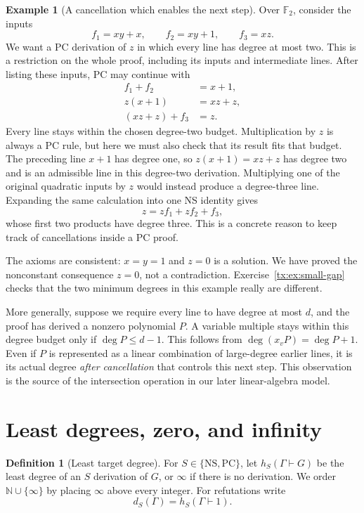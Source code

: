\documentclass[11pt,a4paper,oneside,openany]{book}
\theoremstyle{definition}\newtheorem{definition}[theorem]{Definition}
\newtheorem{example}[theorem]{Example}
\theoremstyle{remark}\newtheorem{remark}[theorem]{Remark}
\newcommand{\NS}{\mathrm{NS}}\newcommand{\PC}{\mathrm{PC}}
\newcommand{\NN}{\mathbb N}\newcommand{\N}{\mathbb N}\newcommand{\Z}{\mathbb Z}\newcommand{\Q}{\mathbb Q}\newcommand{\Fp}{\mathbb F_p}
\numberwithin{equation}{chapter}
\begin{document}
\begin{example}[A cancellation which enables the next step]\label{tx:eg:cancellation}
Over $\mathbb F_2$, consider the inputs
\[
                   f_1=xy+x,\qquad f_2=xy+1,\qquad f_3=xz.
\]
We want a PC derivation of $z$ in which every line has degree at most
two. This is a restriction on the whole proof, including its inputs and
intermediate lines. After listing these inputs, PC may continue with
\begin{align*}
 f_1+f_2&=x+1,\\
 z(x+1)&=xz+z,\\
 (xz+z)+f_3&=z.
\end{align*}
Every line stays within the chosen degree-two budget. Multiplication
by $z$ is always a PC rule, but here we must also check that its result
fits that budget. The preceding line $x+1$ has degree one, so
$z(x+1)=xz+z$ has degree two and is an admissible line in this
degree-two derivation. Multiplying one of the original quadratic inputs
by $z$ would instead produce a degree-three line. Expanding the same calculation into
one NS identity gives
\[
                          z=zf_1+zf_2+f_3,
\]
whose first two products have degree three. This is a concrete reason to
keep track of cancellations inside a PC proof.

The axioms are consistent: $x=y=1$ and $z=0$ is a solution. We have
proved the nonconstant consequence $z=0$, not a contradiction.
Exercise~\ref{tx:ex:small-gap} checks that the two minimum degrees in
this example really are different.
\end{example}

More generally, suppose we require every line to have degree at most
$d$, and the proof has derived a nonzero polynomial $P$. A variable
multiple stays within this degree budget only if $\deg P\le d-1$. This follows from
$\deg(x_vP)=\deg P+1$. Even if $P$ is represented as a linear combination
of large-degree earlier lines, it is its actual degree \emph{after
cancellation} that controls this next step. This observation is the
source of the intersection operation in our later linear-algebra model.

\section{Least degrees, zero, and infinity}
\begin{definition}[Least target degree]\label{tx:def:least-degree}
For $S\in\{\NS,\PC\}$, let $h_S(\Gamma\vdash G)$ be the least degree
of an $S$ derivation of $G$, or $\infty$ if there is no derivation.
We order $\NN\cup\{\infty\}$ by placing $\infty$ above every integer.
For refutations write
\[
                      d_S(\Gamma)=h_S(\Gamma\vdash1).
\]
\end{definition}
\end{document}
